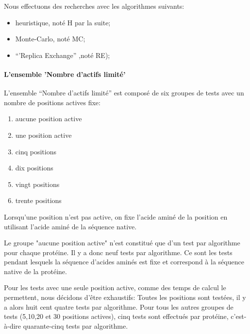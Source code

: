 Nous effectuons des recherches avec les algorithmes suivants:

\begin{itemize}
\item heuristique, noté H par la suite;
\item Monte-Carlo, noté MC;
\item ``'Replica Exchange'' ,noté RE);
\end{itemize}


\paragraph{L'ensemble 'Nombre d'actifs limité'}

L'ensemble ``Nombre d'actifs limité'' est composé de six groupes de tests avec un nombre de positions actives fixe:  


\begin{enumerate}
\item aucune position active
\item une position active 
\item cinq positions 
\item dix  positions 
\item vingt positions 
\item trente positions 
\end{enumerate}

Lorsqu'une position n'est pas active, on fixe l'acide aminé de la position en utilisant l'acide aminé de la séquence native.

Le groupe "aucune position active" n'est constitué que d'un test par algorithme pour chaque protéine. Il y a donc neuf tests par algorithme.
Ce sont les tests pendant lesquels  la séquence d'acides aminés est fixe et correspond à la séquence native de la protéine.

Pour les tests avec une seule position active, comme des temps de calcul le permettent, nous décidons d'être exhaustifs:
Toutes les positions sont testées, il y a alors huit cent quatre tests par algorithme.
Pour tous les autres groupes de tests (5,10,20 et 30 positions actives), cinq tests sont effectués par protéine, c'est-à-dire quarante-cinq tests par algorithme.

